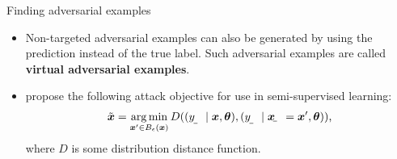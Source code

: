\documentclass{beamer}
\newcommand{\citet}[1]{{\color{citecolor}\relscale{0.8}\textcite{#1}}}
\begin{document}
\begin{frame}[allowframebreaks=0.9]{Finding adversarial examples}
\begin{itemize}
	\item Non-targeted adversarial examples can also be generated by using the prediction instead of the true label. Such adversarial examples are called \textbf{virtual adversarial examples}.	
	\item \citet{Miyato:2017:VATRMSSSL,Kurakin:2016:AMLS} propose the following attack objective for use in semi-supervised learning:
	\begin{align}
	\tilde{\vec x} = \argmin_{\vec x'\in B_\epsilon(\vec x)} D((\rvar y\mid \vec x, \vec\theta), (\rvar y\mid \rvec x = \vec x', \vec\theta)) \text{,}
	\end{align}
	where $D$ is some distribution distance function.
\end{itemize}
\end{frame}
\end{document}
